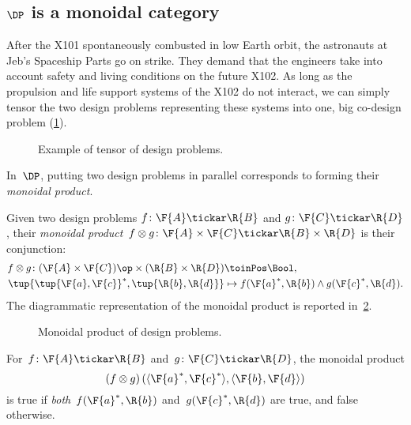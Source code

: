 \subsection{$\DP$ is a monoidal category}
\begin{example}
After the X101 spontaneously combusted in low Earth orbit, the astronauts at Jeb's Spaceship Parts go on strike. They demand that the engineers take into account safety and living conditions on the future X102. As long as the propulsion and life support systems of the X102 do not interact, we can simply tensor the two design problems representing these systems into one, big co-design problem (\cref{fig:examplemonoidal}).
\begin{figure}[h!]
\begin{center}
\end{center}
\caption{Example of tensor of design problems. \label{fig:examplemonoidal}}
\end{figure}
\end{example}
In~$\DP$, putting two design problems in parallel corresponds to forming their \emph{monoidal product}. 

\begin{definition}
\label{def:monoidalproduct}
Given two design problems $f \colon \F{A} \tickar \R{B}$ and $g \colon \F{C} \tickar \R{D}$,
their \emph{monoidal product}~$f\otimes g \colon \F{A} \times \F{C} \tickar \R{B} \times \R{D}$ is their conjunction:
\begin{equation}
\begin{aligned}
f \otimes g \colon (\F{A} \times \F{C})\op \times (\R{B} \times \R{D}) & \toinPos \Bool, \\
\tup{\tup{\F{a},\F{c}}^*,\tup{\R{b},\R{d}}} &\mapsto f(\F{a}^*,\R{b}) \wedge g(\F{c}^*,\R{d}). 
\end{aligned}
\end{equation}
The diagrammatic representation of the monoidal product is reported in~\cref{fig:dpmonoidal}.
\end{definition}

\begin{figure}[h!]
\begin{center}
\end{center}
\caption{Monoidal product of design problems. \label{fig:dpmonoidal}}
\end{figure}


\begin{remark}
For~$f \colon \F{A} \tickar \R{B}$ and~$g \colon \F{C} \tickar \R{D}$, the monoidal product
\begin{equation}
    \left(f \otimes g\right)(\langle \F{a}^*, \F{c}^*\rangle, \langle \F{b},\F{d} \rangle)
\end{equation}
is true if \emph{both}~$f(\F{a}^*,\R{b})$ and~$g(\F{c}^*,\R{d})$ are true, and false otherwise.
\end{remark}

